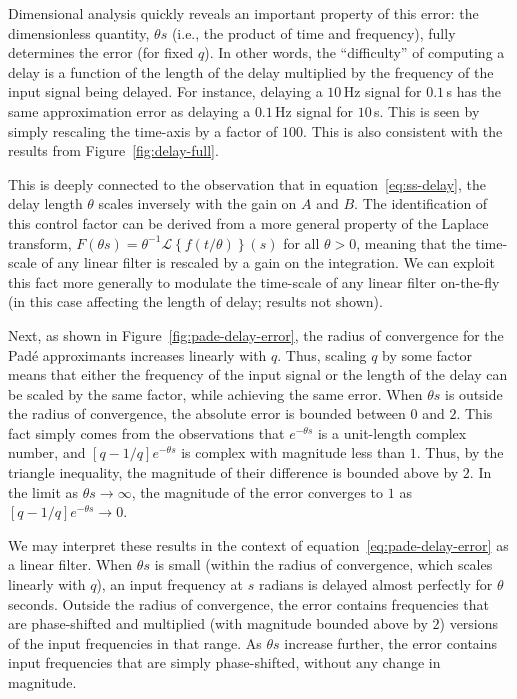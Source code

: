 Dimensional analysis quickly reveals an important property of this error: the dimensionless quantity, $\theta s$ (i.e., the product of time and frequency), fully determines the error (for fixed $q$).
In other words, the ``difficulty'' of computing a delay is a function of the length of the delay multiplied by the frequency of the input signal being delayed.
For instance, delaying a $10$\,Hz signal for $0.1$\,s has the same approximation error as delaying a $0.1$\,Hz signal for $10$\,s.
This is seen by simply rescaling the time-axis by a factor of $100$.
This is also consistent with the results from Figure~\ref{fig:delay-full}.

This is deeply connected to the observation that in equation~\ref{eq:ss-delay}, the delay length $\theta$ scales inversely with the gain on $A$ and $B$.
The identification of this control factor can be derived from a more general property of the Laplace transform, $F \left( \theta s \right) = \theta^{-1} \mathcal{L} \left\{ f \left( t / \theta \right) \right\} (s)$ for all $\theta > 0$, meaning that the time-scale of any linear filter is rescaled by a gain on the integration.
We can exploit this fact more generally to modulate the time-scale of any linear filter on-the-fly (in this case affecting the length of delay; results not shown).

Next, as shown in Figure~\ref{fig:pade-delay-error}, the radius of convergence for the Pad\'e approximants increases linearly with $q$.
Thus, scaling $q$ by some factor means that either the frequency of the input signal or the length of the delay can be scaled by the same factor, while achieving the same error.
When $\theta s$ is outside the radius of convergence, the absolute error is bounded between $0$ and $2$.
This fact simply comes from the observations that $e^{-\theta s}$ is a unit-length complex number, and $[q-1/q]e^{-\theta s}$ is complex with magnitude less than $1$.
Thus, by the triangle inequality, the magnitude of their difference is bounded above by $2$.
In the limit as $\theta s \rightarrow \infty$, the magnitude of the error converges to $1$ as $[q-1/q]e^{-\theta s} \rightarrow 0$.

We may interpret these results in the context of equation~\ref{eq:pade-delay-error} as a linear filter.
When $\theta s$ is small (within the radius of convergence, which scales linearly with $q$), an input frequency at $s$ radians is delayed almost perfectly for $\theta$ seconds.
Outside the radius of convergence, the error contains frequencies that are phase-shifted and multiplied (with magnitude bounded above by $2$) versions of the input frequencies in that range.
As $\theta s$ increase further, the error contains input frequencies that are simply phase-shifted, without any change in magnitude.

